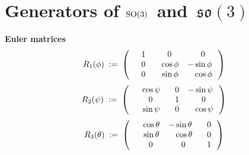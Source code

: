 
\section{Generators of \;$\textnormal{SO}(3)$\, and \,$\mathfrak{so}(3)$}


\vskip 0.1cm
\noindent
\textbf{Euler matrices}
\begin{equation*}
R_{1}(\phi)
\; := \;
	\left(\,
		\begin{array}{ccc}
			{\color{white}-}1 & {\color{white}-}0 & {\color{white}-}0 \\
			{\color{white}-}0 & {\color{white}-}\cos\phi & -\sin\phi \\
			{\color{white}-}0 & {\color{white}-}\sin\phi & {\color{white}-}\cos\phi \\
			\end{array}
		\,\right)
\end{equation*}
\begin{equation*}
R_{2}(\psi)
\; := \;
	\left(\,
		\begin{array}{ccc}
			{\color{white}-}\cos\psi & {\color{white}-}0 & {\color{black}-}\sin\psi \\
			{\color{white}-}0 & {\color{white}-}1 & {\color{white}-}0 \\
			{\color{white}-}\sin\psi & {\color{white}-}0 & {\color{white}-}\cos\psi \\
			\end{array}
		\,\right)
\end{equation*}
\begin{equation*}
R_{3}(\theta)
\; := \;
	\left(\,
		\begin{array}{ccc}
			{\color{white}-}\cos\theta & -\sin\theta & {\color{white}-}0 \\
			{\color{white}-}\sin\theta & {\color{white}-}\cos\theta & {\color{white}-}0 \\
			{\color{white}-}0 & {\color{white}-}0 & {\color{white}-}1 \\
			\end{array}
		\,\right)
\end{equation*}


